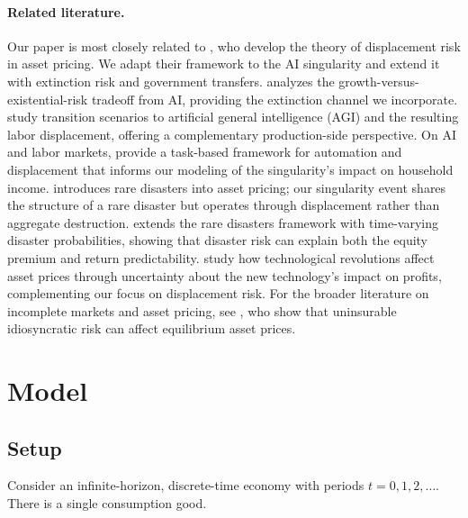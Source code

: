 \documentclass[12pt]{article}
\begin{document}
\paragraph{Related literature.} Our paper is most closely related to \citet{GKP2012}, who develop the theory of displacement risk in asset pricing. We adapt their framework to the AI singularity and extend it with extinction risk and government transfers. \citet{Jones2024} analyzes the growth-versus-existential-risk tradeoff from AI, providing the extinction channel we incorporate. \citet{KorinekSuh2024} study transition scenarios to artificial general intelligence (AGI) and the resulting labor displacement, offering a complementary production-side perspective. On AI and labor markets, \citet{AcemogluRestrepo2018} provide a task-based framework for automation and displacement that informs our modeling of the singularity's impact on household income. \citet{Barro2006} introduces rare disasters into asset pricing; our singularity event shares the structure of a rare disaster but operates through displacement rather than aggregate destruction. \citet{Wachter2013} extends the rare disasters framework with time-varying disaster probabilities, showing that disaster risk can explain both the equity premium and return predictability. \citet{Pastor2009} study how technological revolutions affect asset prices through uncertainty about the new technology's impact on profits, complementing our focus on displacement risk. For the broader literature on incomplete markets and asset pricing, see \citet{ConstantinidesDuffie1996}, who show that uninsurable idiosyncratic risk can affect equilibrium asset prices.


\section{Model}

\subsection{Setup}

Consider an infinite-horizon, discrete-time economy with periods $t = 0, 1, 2, \ldots$. There is a single consumption good.
\end{document}
